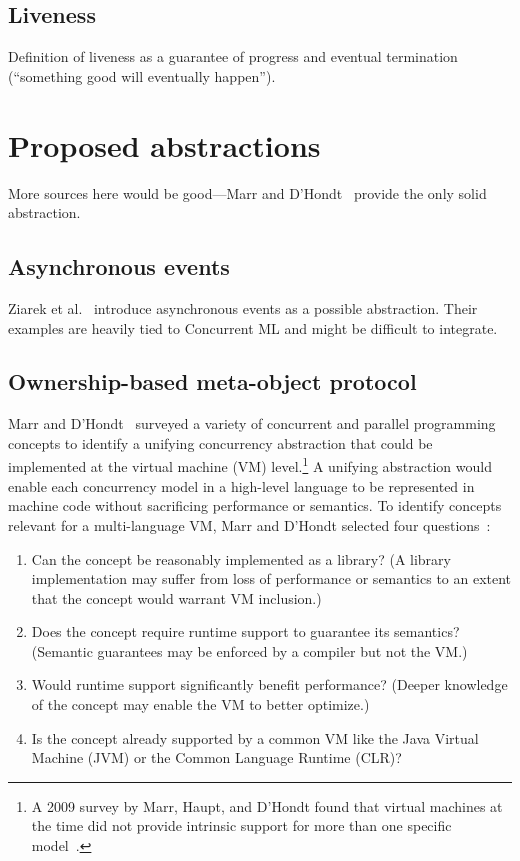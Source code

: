 \documentclass{sig-alternate}
\begin{document}
\subsection{Liveness}

Definition of liveness as a guarantee of progress and eventual termination (``something good will eventually happen'').

\section{Proposed abstractions}

More sources here would be good---Marr and D'Hondt~\cite{Marr2012} provide the only solid abstraction.

\subsection{Asynchronous events}

Ziarek et al.~\cite{Ziarek2011} introduce asynchronous events as a possible abstraction. Their examples are heavily tied to Concurrent ML and might be difficult to integrate.

\subsection{Ownership-based meta-object protocol}

Marr and D'Hondt~\cite{Marr2012} surveyed a variety of concurrent and parallel programming concepts to identify a unifying concurrency abstraction that could be implemented at the virtual machine (VM) level.\footnote{A 2009 survey by Marr, Haupt, and D'Hondt found that virtual machines at the time did not provide intrinsic support for more than one specific model~\cite{Marr2009}.} A unifying abstraction would enable each concurrency model in a high-level language to be represented in machine code without sacrificing performance or semantics. To identify concepts relevant for a multi-language VM, Marr and D'Hondt selected four questions~\cite{Marr2012}:

\begin{enumerate}
  \item Can the concept be reasonably implemented as a library? (A library implementation may suffer from loss of performance or semantics to an extent that the concept would warrant VM inclusion.)

  \item Does the concept require runtime support to guarantee its semantics? (Semantic guarantees may be enforced by a compiler but not the VM.)

  \item Would runtime support significantly benefit performance? (Deeper knowledge of the concept may enable the VM to better optimize.)

  \item Is the concept already supported by a common VM like the Java Virtual Machine (JVM) or the Common Language Runtime (CLR)?
\end{enumerate}
\end{document}
